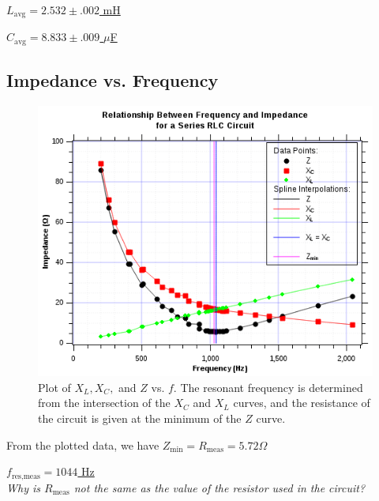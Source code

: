 \documentclass[twocolumn,english]{IEEEtran}
\theoremstyle{plain}
\theoremstyle{plain}
\begin{document}
\underline{$L_{\text{avg}} = 2.532\pm .002$ mH}

\underline{$C_{\text{avg}} = 8.833 \pm .009$ $\mu$F}

\hrulefill

\subsection{Impedance vs. Frequency}


\begin{figure}[H]
	\begin{centering}
	\begin{center}
	\includegraphics[width=\linewidth]{./Part2.png}
	\caption{Plot of $X_L, X_C, $ and $Z$ vs. $f$. The resonant frequency is determined from the intersection of the $X_C$ and $X_L$ curves, and the resistance of the circuit is given at the minimum of the $Z$ curve.}
	\label{fig:xf_graph1}
	\end{center}
	\par\end{centering}
\end{figure}

From the plotted data, we have
\hfill\underline{$Z_{\text{min}} = R_{\text{meas}} = 5.72 \Omega$}

\hfill\underline{$f_{\text{res,meas}} = 1044$ Hz} \\

\textit{Why is $R_{\text{meas}}$ not the same as the value of the resistor used in the circuit?}
\end{document}

